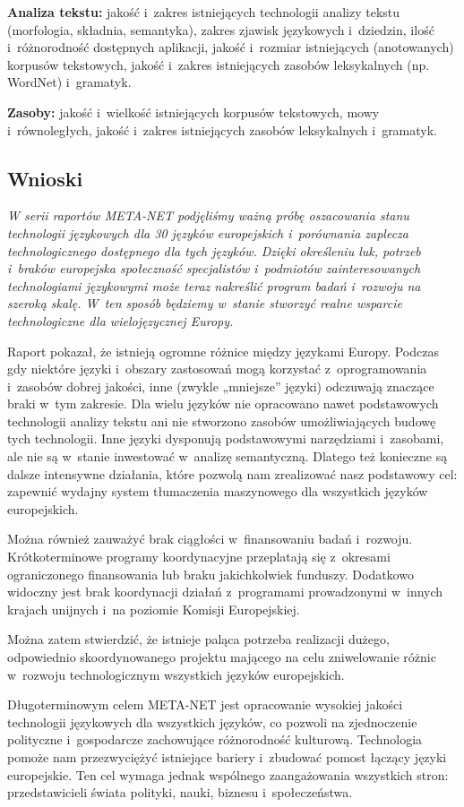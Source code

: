 \begin{multicols}{2}
\textbf{Analiza tekstu:} jakość i~zakres istniejących technologii
analizy tekstu (morfologia, składnia, semantyka), zakres zjawisk
językowych i~dziedzin, ilość i~różnorodność dostępnych
aplikacji, jakość i~rozmiar istniejących (anotowanych) korpusów
tekstowych, jakość i~zakres istniejących zasobów leksykalnych (np.
WordNet) i~gramatyk. 

\textbf{Zasoby:} jakość i~wielkość istniejących korpusów
tekstowych, mowy i~równoległych, jakość i~zakres istniejących
zasobów leksykalnych i~gramatyk. 

\subsection{Wnioski} 

\emph{W serii raportów META-NET podjęliśmy ważną próbę
oszacowania stanu technologii językowych dla 30 języków
europejskich i~porównania zaplecza technologicznego dostępnego dla
tych języków. Dzięki określeniu luk, potrzeb i~braków europejska
społeczność specjalistów i~podmiotów zainteresowanych
technologiami językowymi może teraz nakreślić program badań
i~rozwoju na szeroką skalę. W~ten sposób będziemy w~stanie
stworzyć realne wsparcie technologiczne dla wielojęzycznej Europy.} 

Raport pokazał, że istnieją ogromne różnice między językami
Europy. Podczas gdy niektóre języki i~obszary zastosowań mogą
korzystać z~oprogramowania i~zasobów dobrej jakości, inne (zwykle
„mniejsze” języki) odczuwają znaczące braki w~tym zakresie. Dla
wielu języków nie opracowano nawet podstawowych technologii analizy
tekstu ani nie stworzono zasobów umożliwiających budowę tych
technologii. Inne języki dysponują podstawowymi narzędziami
i~zasobami, ale nie są w~stanie inwestować w~analizę semantyczną.
Dlatego też konieczne są dalsze intensywne działania, które
pozwolą nam zrealizować nasz podstawowy cel: zapewnić wydajny
system tłumaczenia maszynowego dla wszystkich języków europejskich. 

Można również zauważyć brak ciągłości w~finansowaniu badań
i~rozwoju. Krótkoterminowe programy koordynacyjne przeplatają się
z~okresami ograniczonego finansowania lub braku jakichkolwiek
funduszy. Dodatkowo widoczny jest brak koordynacji działań
z~programami prowadzonymi w~innych krajach unijnych i~na poziomie
Komisji Europejskiej. 

Można zatem stwierdzić, że istnieje paląca potrzeba realizacji
dużego, odpowiednio skoordynowanego projektu mającego na celu
zniwelowanie różnic w~rozwoju technologicznym wszystkich języków
europejskich. 

Długoterminowym celem META-NET jest opracowanie wysokiej jakości
technologii językowych dla wszystkich języków, co pozwoli na
zjednoczenie polityczne i~gospodarcze zachowujące różnorodność
kulturową. Technologia pomoże nam przezwyciężyć istniejące
bariery i~zbudować pomost łączący języki europejskie. Ten cel
wymaga jednak wspólnego zaangażowania wszystkich stron:
przedstawicieli świata polityki, nauki, biznesu i~społeczeństwa. 

\end{multicols}
